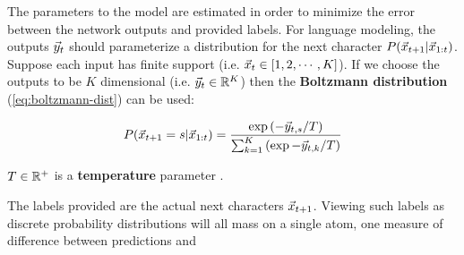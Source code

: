 The parameters to the model are estimated in order to minimize the error
between the network outputs and provided labels. For language modeling, the
outputs $\vec{y}_t$ should parameterize a distribution for the next character
$P(\vec{x}_{t+1} | \vec{x}_{1:t})$. Suppose each input has finite support (i.e.
$\vec{x}_t \in [1,2,\cdots,K]$). If we choose the outputs to be $K$ dimensional
(i.e. $\vec{y}_t \in \mathbb{R}^K$) then the \textbf{Boltzmann distribution}
(\autoref{eq:boltzmann-dist}) can be used:

\begin{equation}
    \label{eq:boltzmann-dist}
    P(\vec{x}_{t+1} = s | \vec{x}_{1:t})
    = \frac{\exp \left(-\vec{y}_{t,s}/T\right) }{ \sum_{k=1}^{K} \left(\exp -\vec{y}_{t,k}/T\right)}
\end{equation}

$T \in \mathbb{R}^+$ is a \textbf{temperature} parameter .

The labels provided are the actual next characters $\vec{x}_{t+1}$. Viewing
such labels as discrete probability distributions will all mass on a single atom,
one measure of difference between predictions and 
